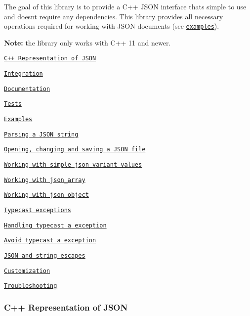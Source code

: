 The goal of this library is to provide a C++ J\+S\+ON interface that\textquotesingle{}s simple to use and doesn\textquotesingle{}t require any dependencies. This library provides all necessary operations required for working with J\+S\+ON documents (see \href{#expamles_section}{\tt examples}).

{\bfseries Note\+:} the library only works with C++ 11 and newer.


\begin{DoxyItemize}
\item \href{#cpp_representation_section}{\tt C++ Representation of J\+S\+ON}
\item \href{#integration_section}{\tt Integration}
\item \href{#doc_section}{\tt Documentation}
\item \href{#tests_section}{\tt Tests}
\item \href{#expamles_section}{\tt Examples}
\begin{DoxyItemize}
\item \href{#parsing_json_string_section}{\tt Parsing a J\+S\+ON string}
\item \href{#opening_changing_section}{\tt Opening, changing and saving a J\+S\+ON file}
\item \href{#working_with_simple_section}{\tt Working with simple json\+\_\+variant values}
\item \href{#working_with_json_array_section}{\tt Working with json\+\_\+array}
\item \href{#working_with_json_object_section}{\tt Working with json\+\_\+object}
\item \href{#typecast_exceptions_section}{\tt Typecast exceptions}
\begin{DoxyItemize}
\item \href{#handling_typecast_expception_section}{\tt Handling typecast a exception}
\item \href{#avoid_typecast_exception_section}{\tt Avoid typecast a exception}
\end{DoxyItemize}
\item \href{#json_and_string_escapes_section}{\tt J\+S\+ON and string escapes}
\end{DoxyItemize}
\item \href{#customization_section}{\tt Customization}
\item \href{#troubleshooting_section}{\tt Troubleshooting}
\end{DoxyItemize}

\subsubsection*{\label{_cpp_representation_section}%
C++ Representation of J\+S\+ON}

